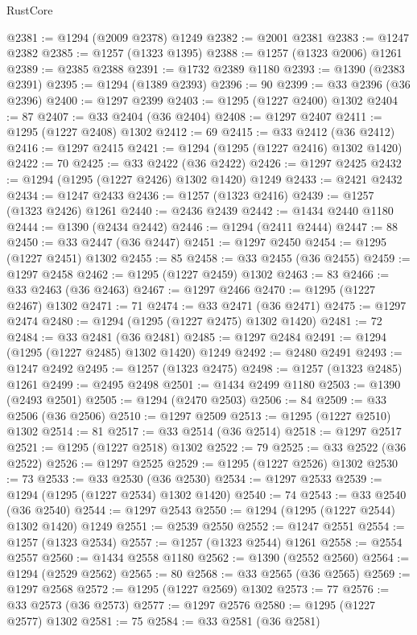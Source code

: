 \begin{lexlean}{RustCore}
\begin{coremodule}
@2381 := @1294 (@2009 @2378) @1249
@2382 := @2001 @2381
@2383 := @1247 @2382
@2385 := @1257 (@1323 @1395)
@2388 := @1257 (@1323 @2006) @1261
@2389 := @2385 @2388
@2391 := @1732 @2389 @1180
@2393 := @1390 (@2383 @2391)
@2395 := @1294 (@1389 @2393)
@2396 := 90
@2399 := @33 @2396 (@36 @2396)
@2400 := @1297 @2399
@2403 := @1295 (@1227 @2400) @1302
@2404 := 87
@2407 := @33 @2404 (@36 @2404)
@2408 := @1297 @2407
@2411 := @1295 (@1227 @2408) @1302
@2412 := 69
@2415 := @33 @2412 (@36 @2412)
@2416 := @1297 @2415
@2421 := @1294 (@1295 (@1227 @2416) @1302 @1420)
@2422 := 70
@2425 := @33 @2422 (@36 @2422)
@2426 := @1297 @2425
@2432 := @1294 (@1295 (@1227 @2426) @1302 @1420) @1249
@2433 := @2421 @2432
@2434 := @1247 @2433
@2436 := @1257 (@1323 @2416)
@2439 := @1257 (@1323 @2426) @1261
@2440 := @2436 @2439
@2442 := @1434 @2440 @1180
@2444 := @1390 (@2434 @2442)
@2446 := @1294 (@2411 @2444)
@2447 := 88
@2450 := @33 @2447 (@36 @2447)
@2451 := @1297 @2450
@2454 := @1295 (@1227 @2451) @1302
@2455 := 85
@2458 := @33 @2455 (@36 @2455)
@2459 := @1297 @2458
@2462 := @1295 (@1227 @2459) @1302
@2463 := 83
@2466 := @33 @2463 (@36 @2463)
@2467 := @1297 @2466
@2470 := @1295 (@1227 @2467) @1302
@2471 := 71
@2474 := @33 @2471 (@36 @2471)
@2475 := @1297 @2474
@2480 := @1294 (@1295 (@1227 @2475) @1302 @1420)
@2481 := 72
@2484 := @33 @2481 (@36 @2481)
@2485 := @1297 @2484
@2491 := @1294 (@1295 (@1227 @2485) @1302 @1420) @1249
@2492 := @2480 @2491
@2493 := @1247 @2492
@2495 := @1257 (@1323 @2475)
@2498 := @1257 (@1323 @2485) @1261
@2499 := @2495 @2498
@2501 := @1434 @2499 @1180
@2503 := @1390 (@2493 @2501)
@2505 := @1294 (@2470 @2503)
@2506 := 84
@2509 := @33 @2506 (@36 @2506)
@2510 := @1297 @2509
@2513 := @1295 (@1227 @2510) @1302
@2514 := 81
@2517 := @33 @2514 (@36 @2514)
@2518 := @1297 @2517
@2521 := @1295 (@1227 @2518) @1302
@2522 := 79
@2525 := @33 @2522 (@36 @2522)
@2526 := @1297 @2525
@2529 := @1295 (@1227 @2526) @1302
@2530 := 73
@2533 := @33 @2530 (@36 @2530)
@2534 := @1297 @2533
@2539 := @1294 (@1295 (@1227 @2534) @1302 @1420)
@2540 := 74
@2543 := @33 @2540 (@36 @2540)
@2544 := @1297 @2543
@2550 := @1294 (@1295 (@1227 @2544) @1302 @1420) @1249
@2551 := @2539 @2550
@2552 := @1247 @2551
@2554 := @1257 (@1323 @2534)
@2557 := @1257 (@1323 @2544) @1261
@2558 := @2554 @2557
@2560 := @1434 @2558 @1180
@2562 := @1390 (@2552 @2560)
@2564 := @1294 (@2529 @2562)
@2565 := 80
@2568 := @33 @2565 (@36 @2565)
@2569 := @1297 @2568
@2572 := @1295 (@1227 @2569) @1302
@2573 := 77
@2576 := @33 @2573 (@36 @2573)
@2577 := @1297 @2576
@2580 := @1295 (@1227 @2577) @1302
@2581 := 75
@2584 := @33 @2581 (@36 @2581)

\end{coremodule}
\end{lexlean}
